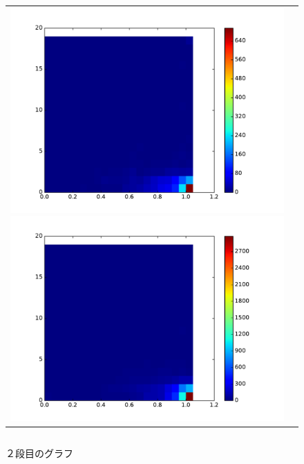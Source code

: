 \documentclass[a4paper,10pt,onecolumn,oneside,openany]{jsbook}
\begin{document}
\begin{figure}[h]
 \begin{tabular}{cc}
 	\begin{minipage}[t]{0.45\hsize}
	 \centering
	 \includegraphics[keepaspectratio, scale = 0.35]{colormap_splite_1.pdf}
	 \caption{１段目のグラフ}
	 \label{first_splite_color}
	\end{minipage}
        \begin{minipage}[t]{0.45\hsize}
	 \centering
	 \includegraphics[keepaspectratio, scale = 0.35]{colormap_splite_2.pdf}
	 \caption{２段目のグラフ}
	 \label{second_splite_color}
	\end{minipage}
 \end{tabular}
  \begin{tabular}{cc}

\end{tabular}
\end{figure}
\end{document}
